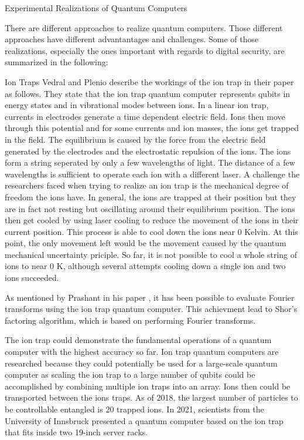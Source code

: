 \documentclass[aps,preprintnumbers,twocolumn]{revtex4}
\begin{document}
\begin{section}{Experimental Realizations of Quantum Computers}

There are different approaches to realize quantum computers.
Those different approaches have different advantantages and challenges. 
Some of those realizations, especially the ones important with regards to digital security, 
are summarized in the following:

\begin{subsection}{Ion Traps}
Vedral and Plenio describe the workings of the ion trap in their paper \cite{2008} as follows. 
They state that the ion trap quantum computer represents qubits in energy states and in vibrational modes between ions. 
In a linear ion trap, currents in electrodes generate a time dependent electric field. 
Ions then move through this potential and for some currents and ion masses, the ions get trapped in the field. 
The equilibrium is caused by the force from the electric field generated by the electrodes and the electrostatic repulsion of the ions. 
The ions form a string seperated by only a few wavelengths of light. 
The distance of a few wavelengths is sufficient to operate each ion with a different laser. 
A challenge the researchers faced when trying to realize an ion trap is the mechanical degree of freedom the ions have. 
In general, the ions are trapped at their position but they are in fact not resting but oscillating around their equilibrium position. 
The ions then get cooled by using laser cooling to reduce the movement of the ions in their current position. 
This process is able to cool down the ions near 0 Kelvin. 
At this point, the only movement left would be the movement caused by the quantum mechanical uncertainty priciple. 
So far, it is not possible to cool a whole string of ions to near 0 K, 
although several attempts cooling down a single ion and two ions succeeded. 

As mentioned by Prashant in his paper \cite{prashant}, it has been possible to evaluate Fourier transforms using the ion trap quantum computer.
This achievment lead to Shor's factoring algorithm, 
which is based on performing Fourier transforms.

The ion trap could demonstrate the fundamental operations of a quantum computer with the highest accuracy so far. 
Ion trap quantum computers are researched because they could potentially be used for a large-scale quantum computer as scaling the ion trap to a large number of qubits could be accomplished by combining multiple ion traps into an array. Ions then could be transported between the ions traps. 
As of 2018, the largest number of particles to be controllable entangled is 20 trapped ions. 
In 2021, scientists from the University of Innsbruck presented a quantum computer based on the ion trap that fits inside two 19-inch server racks.
\end{subsection}


\end{section}
\end{document}
